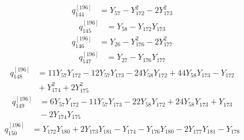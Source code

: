 \begin{equation}\label{q196:row:144}
\begin{aligned}
q_{144}^{[196]} &={} Y_{57} - Y_{172}^{2} - 2Y_{173}^{2}
\end{aligned}
\end{equation}
\begin{equation}\label{q196:row:145}
\begin{aligned}
q_{145}^{[196]} &={} Y_{58} - Y_{172}Y_{173}
\end{aligned}
\end{equation}
\begin{equation}\label{q196:row:146}
\begin{aligned}
q_{146}^{[196]} &={} Y_{26} - Y_{176}^{2} - 2Y_{177}^{2}
\end{aligned}
\end{equation}
\begin{equation}\label{q196:row:147}
\begin{aligned}
q_{147}^{[196]} &={} Y_{27} - Y_{176}Y_{177}
\end{aligned}
\end{equation}
\begin{equation}\label{q196:row:148}
\begin{aligned}
q_{148}^{[196]} &={} 11Y_{57}Y_{172} - 12Y_{57}Y_{173} - 24Y_{58}Y_{172} + 44Y_{58}Y_{173} - Y_{172}\\
&{} + Y_{174}^{2} + 2Y_{175}^{2}
\end{aligned}
\end{equation}
\begin{equation}\label{q196:row:149}
\begin{aligned}
q_{149}^{[196]} &={} 6Y_{57}Y_{172} - 11Y_{57}Y_{173} - 22Y_{58}Y_{172} + 24Y_{58}Y_{173} + Y_{173}\\
&{} - 2Y_{174}Y_{175}
\end{aligned}
\end{equation}
\begin{equation}\label{q196:row:150}
\begin{aligned}
q_{150}^{[196]} &={} Y_{172}Y_{180} + 2Y_{173}Y_{181} - Y_{174} - Y_{176}Y_{180} - 2Y_{177}Y_{181} - Y_{178}
\end{aligned}
\end{equation}
